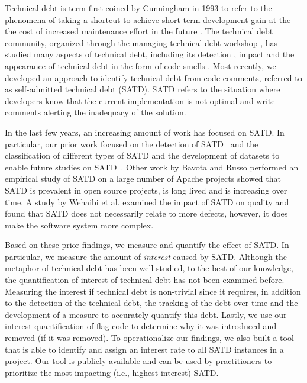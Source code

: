 Technical debt is term first coined by Cunningham in 1993 to refer to the phenomena of taking a shortcut to achieve short term development gain at the the cost of increased maintenance effort in the future \cite{Cunningham1992WPM}. The technical debt community, organized through the managing technical debt workshop \cite{Falessi2014MTD}, has studied many aspects of technical debt, including its detection \cite{Zazworka2013CSE}, impact \cite{Zazworka2011MTD}
and the appearance of technical debt in the form of code smells \cite{Fontana2012MTD}. Most recently, we developed an approach to identify technical debt from code comments, referred to as self-admitted technical debt (SATD). SATD refers to the situation where developers know that the current implementation is not optimal and write comments alerting the inadequacy of the solution.

In the last few years, an increasing amount of work has focused on SATD. In particular, our prior work focused on the detection of SATD~\cite{Potdar2014ICSME} and the classification of different types of SATD and the development of datasets to enable future studies on SATD~\cite{Maldonado2015MTD}. Other work by Bavota and Russo performed an empirical study of SATD on a large number of Apache projects showed that SATD is prevalent in open source projects, is long lived and is increasing over time. A study by Wehaibi et al.  examined the impact of SATD on quality and found that SATD does not necessarily relate to more defects, however, it does make the software system more complex. 

Based on these prior findings, we measure and quantify the effect of SATD. In particular, we measure the amount of \emph{interest} caused by SATD. Although the metaphor of technical debt has been well studied, to the best of our knowledge, the quantification of interest of technical debt has not been examined before. Measuring the interest if technical debt is non-trivial since it requires, in addition to the detection of the technical debt, the tracking of the debt over time and the development of a measure to accurately quantify this debt. Lastly, we use our interest quantification of flag  code to determine why it was introduced and removed (if it was removed). To operationalize our findings, we also built a tool that is able to identify and assign an interest rate to all SATD instances in a project. Our tool is publicly available and can be used by practitioners to prioritize the most impacting (i.e., highest interest) SATD.

